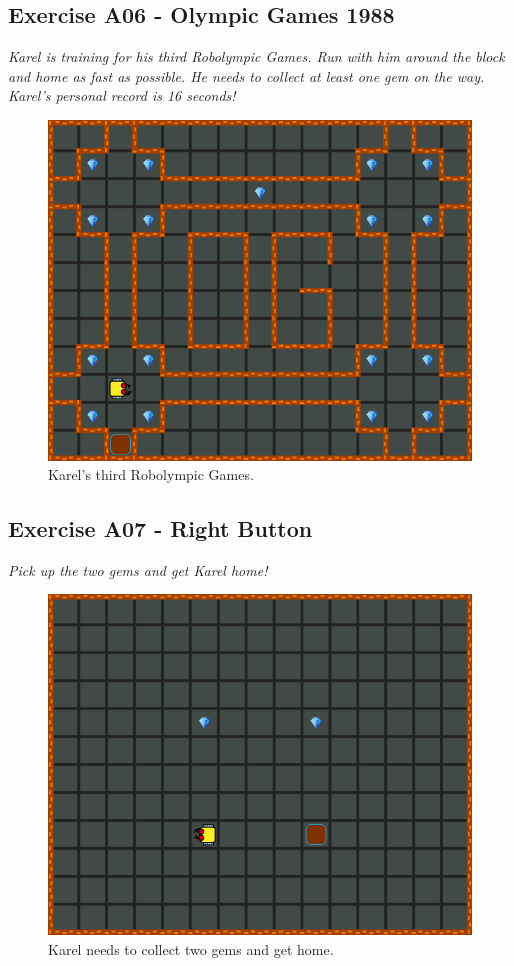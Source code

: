 \subsection{Exercise A06 - Olympic Games 1988 }

{\em Karel is training for his third Robolympic Games. Run with him around the block and home as fast as possible. He needs to collect at least one gem on the way. Karel's personal record is 16 seconds!}

\begin{figure}[!ht]
\begin{center}
\includegraphics[height=0.4\textwidth]{imgk/a06.png}
\end{center}
\vspace{-4mm}
\caption{Karel's third Robolympic Games.}
\label{fig:a06}
\vspace{-1cm}
\end{figure}
\noindent


\subsection{Exercise A07 - Right Button}

{\em Pick up the two gems and get Karel home!}

\begin{figure}[!ht]
\begin{center}
\includegraphics[height=0.4\textwidth]{imgk/a07.png}
\end{center}
\vspace{-4mm}
\caption{Karel needs to collect two gems and get home.}
\label{fig:a07}
\vspace{-1cm}
\end{figure}
\noindent


